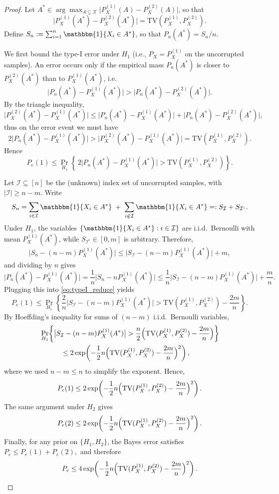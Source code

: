 \documentclass[10pt,a4paper]{amsart}
\begin{document}
\begin{proof}
Let $A^*\in\arg\max_{A\subseteq\mathcal X}\bigl|P_X^{(1)}(A)-P_X^{(2)}(A)\bigr|$, so that
\[
\bigl|P_X^{(1)}(A^*)-P_X^{(2)}(A^*)\bigr|=\mathrm{TV}\!\left(P_X^{(1)},P_X^{(2)}\right).
\]
Define $S_n:=\sum_{i=1}^n \mathbbm{1}\{X_i\in A^*\}$, so that $P_n(A^*)=S_n/n$.

We first bound the type-I error under $H_1$ (i.e., $P_X=P_X^{(1)}$ on the uncorrupted samples).
An error occurs only if the empirical mass $P_n(A^*)$ is closer to $P_X^{(2)}(A^*)$ than to $P_X^{(1)}(A^*)$, i.e.
\[
\bigl|P_n(A^*)-P_X^{(1)}(A^*)\bigr|>\bigl|P_n(A^*)-P_X^{(2)}(A^*)\bigr|.
\]
By the triangle inequality,
\[
\bigl|P_X^{(2)}(A^*)-P_X^{(1)}(A^*)\bigr|
\le
\bigl|P_n(A^*)-P_X^{(1)}(A^*)\bigr|
+
\bigl|P_n(A^*)-P_X^{(2)}(A^*)\bigr|,
\]
thus on the error event we must have
\[
2\bigl|P_n(A^*)-P_X^{(1)}(A^*)\bigr|
>
\bigl|P_X^{(2)}(A^*)-P_X^{(1)}(A^*)\bigr|
=
\mathrm{TV}\!\left(P_X^{(1)},P_X^{(2)}\right).
\]
Hence
\begin{equation}\label{eq:typeI_reduce}
P_e(1)
\le
\Pr_{H_1}\!\left\{\,2\bigl|P_n(A^*)-P_X^{(1)}(A^*)\bigr|
>
\mathrm{TV}\!\left(P_X^{(1)},P_X^{(2)}\right)\right\}.
\end{equation}

Let $\mathcal I\subseteq[n]$ be the (unknown) index set of uncorrupted samples, with $|\mathcal I|\ge n-m$.
Write
\[
S_n = \sum_{i\in\mathcal I}\mathbbm{1}\{X_i\in A^*\} \;+\; \sum_{i\notin\mathcal I}\mathbbm{1}\{X_i\in A^*\}
=: S_{\mathcal I}+S_{\mathcal I^c}.
\]
Under $H_1$, the variables $\{\mathbbm{1}\{X_i\in A^*\}: i\in\mathcal I\}$ are i.i.d.\ Bernoulli with mean
$P_X^{(1)}(A^*)$, while $S_{\mathcal I^c}\in[0,m]$ is arbitrary.
Therefore,
\[
\bigl|S_n-(n-m)P_X^{(1)}(A^*)\bigr|
\le
\bigl|S_{\mathcal I}-(n-m)P_X^{(1)}(A^*)\bigr| + m,
\]
and dividing by $n$ gives
\[
\bigl|P_n(A^*)-P_X^{(1)}(A^*)\bigr|
=
\frac{1}{n}\bigl|S_n-nP_X^{(1)}(A^*)\bigr|
\le
\frac{1}{n}\bigl|S_{\mathcal I}-(n-m)P_X^{(1)}(A^*)\bigr|+\frac{m}{n}.
\]
Plugging this into \eqref{eq:typeI_reduce} yields
\[
P_e(1)
\le
\Pr_{H_1}\!\left\{
\frac{2}{n}\bigl|S_{\mathcal I}-(n-m)P_X^{(1)}(A^*)\bigr|
>
\mathrm{TV}\!\left(P_X^{(1)},P_X^{(2)}\right)-\frac{2m}{n}
\right\}.
\]
By Hoeffding's inequality for sums of $(n-m)$ i.i.d.\ Bernoulli variables,
\begin{align*}
	&\Pr_{H_1}\!\left\{
\bigl|S_{\mathcal I}-(n-m)P_X^{(1)}(A^*)\bigr|
>
\frac{n}{2}\Bigl(\mathrm{TV}(P_X^{(1)},P_X^{(2)})-\frac{2m}{n}\Bigr)
\right\}\\
&\quad\quad\quad\le
2\exp\!\left(
-\frac{1}{2}n\Bigl(\mathrm{TV}(P_X^{(1)},P_X^{(2)})-\frac{2m}{n}\Bigr)^2
\right),
\end{align*}
where we used $n-m\le n$ to simplify the exponent.
Hence,
\[
P_e(1)\le
2\exp\!\left(
-\frac{1}{2}n\Bigl(\mathrm{TV}(P_X^{(1)},P_X^{(2)})-\frac{2m}{n}\Bigr)^2
\right).
\]
The same argument under $H_2$ gives
\[
P_e(2)\le
2\exp\!\left(
-\frac{1}{2}n\Bigl(\mathrm{TV}(P_X^{(1)},P_X^{(2)})-\frac{2m}{n}\Bigr)^2
\right).
\]
Finally, for any prior on $\{H_1,H_2\}$, the Bayes error satisfies
\(
P_e \le P_e(1)+P_e(2),
\)
and therefore
\[
P_e \le
4\exp\!\left(
-\frac{1}{2}n\Bigl(\mathrm{TV}(P_X^{(1)},P_X^{(2)})-\frac{2m}{n}\Bigr)^2
\right).
\]
\end{proof}
\end{document}
